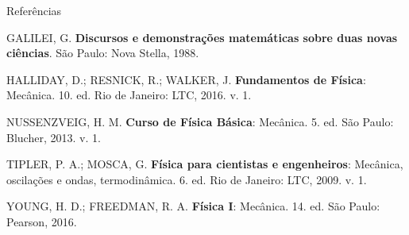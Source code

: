 \documentclass[12pt]{beamer}
\begin{document}
\begin{frame}[allowframebreaks]{Referências}
    \tiny
    \begin{thebibliography}{99}
        GALILEI, G. \textbf{Discursos e demonstrações matemáticas sobre duas novas ciências}. São Paulo: Nova Stella, 1988.

        HALLIDAY, D.; RESNICK, R.; WALKER, J. \textbf{Fundamentos de Física}: Mecânica. 10. ed. Rio de Janeiro: LTC, 2016. v. 1.

        NUSSENZVEIG, H. M. \textbf{Curso de Física Básica}: Mecânica. 5. ed. São Paulo: Blucher, 2013. v. 1.

        TIPLER, P. A.; MOSCA, G. \textbf{Física para cientistas e engenheiros}: Mecânica, oscilações e ondas, termodinâmica. 6. ed. Rio de Janeiro: LTC, 2009. v. 1.

        YOUNG, H. D.; FREEDMAN, R. A. \textbf{Física I}: Mecânica. 14. ed. São Paulo: Pearson, 2016.
    \end{thebibliography}
\end{frame}
\end{document}
